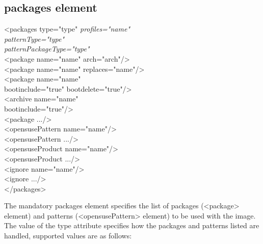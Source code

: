\subsection{packages element}
\begin{Command}{12cm}
<packages type="type" \textit{profiles="name"}\\
\hspace*{2.5cm}\textit{patternType="type"}\\
\hspace*{2.5cm}\textit{patternPackageType="type"}\\
\hspace*{1cm}<package name="name" arch="arch"/>\\
\hspace*{1cm}<package name="name" replaces="name"/>\\
\hspace*{1cm}<package name="name"\\
\hspace*{2.5cm}bootinclude="true" bootdelete="true"/>\\
\hspace*{1cm}<archive name="name"\\
\hspace*{2.5cm}bootinclude="true"/>\\
\hspace*{1cm}<package .../>\\
\hspace*{1cm}<opensusePattern name="name"/>\\
\hspace*{1cm}<opensusePattern .../>\\
\hspace*{1cm}<opensuseProduct name="name"/>\\
\hspace*{1cm}<opensuseProduct .../>\\
\hspace*{1cm}<ignore name="name"/>\\
\hspace*{1cm}<ignore .../>\\
</packages>
\end{Command}

The mandatory packages element specifies the list of packages (<package> 
element) and patterns (<opensusePattern> element) to be used with the image.
The value of the type attribute specifies how the packages and patterns 
listed are handled, supported values are as follows:

